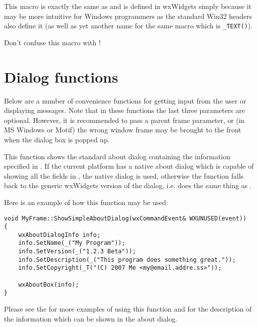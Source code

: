 
This macro is exactly the same as  and is defined in
wxWidgets simply because it may be more intuitive for Windows programmers as
the standard Win32 headers also define it (as well as yet another name for the
same macro which is {\tt \_TEXT()}).

Don't confuse this macro with !



\section{Dialog functions}\label{dialogfunctions}

Below are a number of convenience functions for getting input from the
user or displaying messages. Note that in these functions the last three
parameters are optional. However, it is recommended to pass a parent frame
parameter, or (in MS Windows or Motif) the wrong window frame may be brought to
the front when the dialog box is popped up.


\label{wxaboutbox}


This function shows the standard about dialog containing the information
specified in . If the current platform has a native about dialog
which is capable of showing all the fields in , the native dialog is
used, otherwise the function falls back to the generic wxWidgets version of the
dialog, i.e. does the same thing as .

Here is an example of how this function may be used:
\begin{verbatim}
void MyFrame::ShowSimpleAboutDialog(wxCommandEvent& WXUNUSED(event))
{
    wxAboutDialogInfo info;
    info.SetName(_("My Program"));
    info.SetVersion(_("1.2.3 Beta"));
    info.SetDescription(_("This program does something great."));
    info.SetCopyright(_T("(C) 2007 Me <my@email.addre.ss>"));

    wxAboutBox(info);
}
\end{verbatim}

Please see the  for more examples of
using this function and  for the
description of the information which can be shown in the about dialog.


